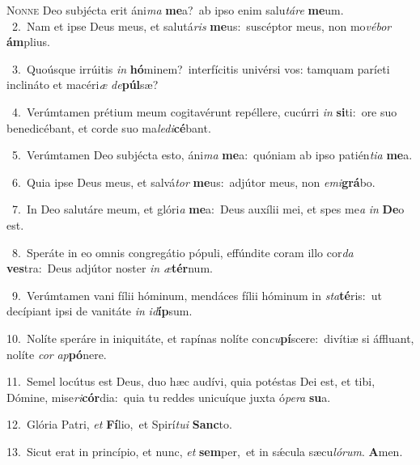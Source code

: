 \lettrine{\initial\textcolor{\initialcolor}{N}}{onne} Deo subjécta erit áni\textit{ma} \textbf{me}\-a?~\star ab ipso enim salu\-\textit{tá}\-\textit{re} \textbf{me}\-um.\\
{\numbfont\textcolor{\numbcolor}{~2.}}~Nam et ipse Deus meus, et salutá\textit{ris} \textbf{me}\-us:~\star suscéptor meus, non mo\-\textit{vé}\-\textit{bor} \textbf{ám}\-plius.\par
{\numbfont\textcolor{\numbcolor}{~3.}}~Quoúsque irrúitis \textit{in} \textbf{hó}\-minem?~\star interfícitis univérsi vos: tamquam paríeti inclináto et macéri\textit{æ} \textit{de}\-\textbf{púl}sæ?\par
{\numbfont\textcolor{\numbcolor}{~4.}}~Verúmtamen prétium meum cogitavérunt repéllere, cucúrri \textit{in} \textbf{si}\-ti:~\star ore suo benedicébant, et corde suo ma\-\textit{le}\-\textit{di}\textbf{cé}bant.\par
{\numbfont\textcolor{\numbcolor}{~5.}}~Verúmtamen Deo subjécta esto, áni\textit{ma} \textbf{me}\-a:~\star quóniam ab ipso patién\-\textit{ti}\-\textit{a} \textbf{me}\-a.\par
{\numbfont\textcolor{\numbcolor}{~6.}}~Quia ipse Deus meus, et salvá\textit{tor} \textbf{me}\-us:~\star adjútor meus, non \textit{e}\-\textit{mi}\textbf{grá}bo.\par
{\numbfont\textcolor{\numbcolor}{~7.}}~In Deo salutáre meum, et glóri\textit{a} \textbf{me}\-a:~\star Deus auxílii mei, et spes me\textit{a} \textit{in} \textbf{De}\-o est.\par
{\numbfont\textcolor{\numbcolor}{~8.}}~Speráte in eo omnis congregátio pópuli, effúndite coram illo cor\textit{da} \textbf{ves}\-tra:~\star Deus adjútor noster \textit{in} \textit{æ}\-\textbf{tér}num.\par
{\numbfont\textcolor{\numbcolor}{~9.}}~Verúmtamen vani fílii hóminum, mendáces fílii hóminum in \textit{sta}\-\textbf{té}ris:~\star ut decípiant ipsi de vanitáte \textit{in} \textit{id}\-\textbf{íp}sum.\par
{\numbfont\textcolor{\numbcolor}{10.}}~Nolíte speráre in iniquitáte, et rapínas nolíte con\-\textit{cu}\-\textbf{pí}scere:~\star divítiæ si áffluant, nolíte \textit{cor} \textit{ap}\-\textbf{pó}nere.\par
{\numbfont\textcolor{\numbcolor}{11.}}~Semel locútus est Deus, duo hæc audívi, quia potéstas Dei est, et tibi, Dómine, mise\-\textit{ri}\-\textbf{cór}dia:~\star quia tu reddes unicuíque juxta ó\-\textit{pe}\-\textit{ra} \textbf{su}\-a.\par
{\numbfont\textcolor{\numbcolor}{12.}}~Glória Patri, \textit{et} \textbf{Fí}\-lio,~\star et Spirí\-\textit{tu}\-\textit{i} \textbf{Sanc}\-to.\par
{\numbfont\textcolor{\numbcolor}{13.}}~Sicut erat in princípio, et nunc, \textit{et} \textbf{sem}\-per,~\star et in sǽcula sæcu\-\textit{ló}\-\textit{rum}. \textbf{A}\-men.\par
